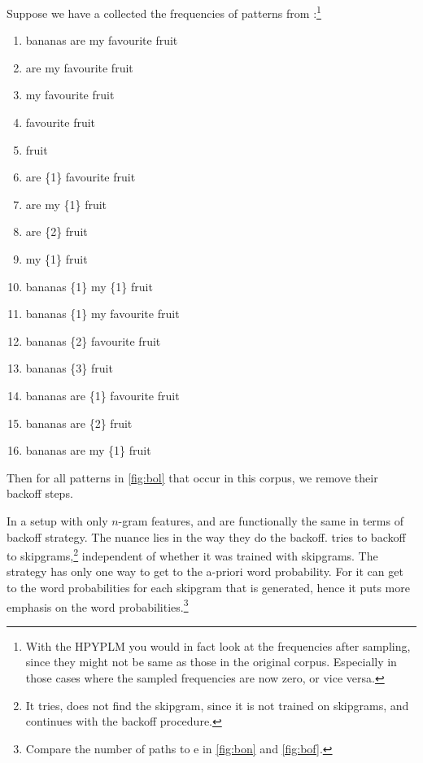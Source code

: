 Suppose we have a collected the frequencies of patterns from \obw:\footnote{With the HPYPLM you would in fact look at the frequencies after sampling, since they might not be same as those in the original corpus. Especially in those cases where the sampled frequencies are now zero, or vice versa.}
\begin{multicols}{2}\begin{enumerate}
	\item[0] bananas are my favourite fruit
	\item[1] are my favourite fruit
	\item[2] my favourite fruit 
	\item[7] favourite fruit
	\item[15391] fruit
	\item[1] are \{1\} favourite fruit
	\item[1] are my \{1\} fruit
	\item[90] are \{2\} fruit
	\item[13] my \{1\} fruit
	\item[0] bananas \{1\} my \{1\} fruit
	\item[0] bananas \{1\} my favourite fruit
	\item[0] bananas \{2\} favourite fruit
	\item[4] bananas \{3\} fruit
	\item[0] bananas are \{1\} favourite fruit
	\item[0] bananas are \{2\} fruit
	\item[0] bananas are my \{1\} fruit
\end{enumerate}\label{enum:minicorpus}\end{multicols}%
%
%
\noindent Then for all patterns in \cref{fig:bol} that occur in this corpus, we remove their backoff steps.



In a setup with only $n$-gram features, \BON and \BOF are functionally the same in terms of backoff strategy. The nuance lies in the way they do the backoff. \BOF tries to backoff to skipgrams,\footnote[][5em]{It tries, does not find the skipgram, since it is not trained on skipgrams, and continues with the backoff procedure.} independent of whether it was trained with skipgrams. The \BON strategy has only one way to get to the a-priori word probability. 
For \BOF it can get to the word probabilities for each skipgram that is generated, hence it puts more emphasis on the word probabilities.\footnote{Compare the number of paths to e in \cref{fig:bon} and \cref{fig:bof}.}

